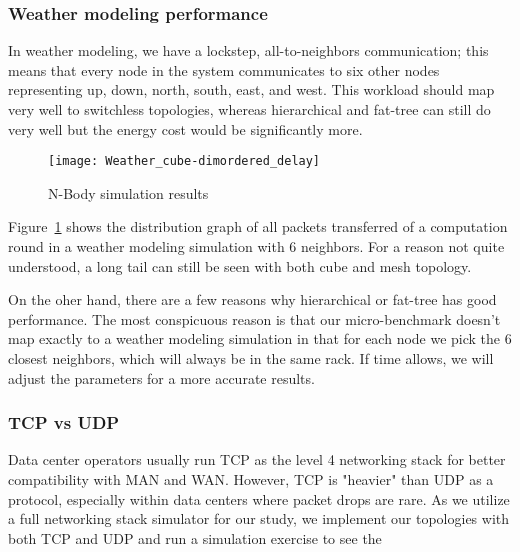 \subsubsection{Weather modeling performance}
In weather modeling, we have a lockstep, all-to-neighbors communication; this means that every node in the system communicates to six other nodes representing up, down, north, south, east, and west. This workload should map very well to switchless topologies, whereas hierarchical and fat-tree can still do very well but the energy cost would be significantly more.

\captionsetup[subfloat]{captionskip=-0.003in}
\begin{figure}
    \centering
        \texttt{[image: Weather\_cube-dimordered\_delay]}
        \label{fig:weather_packetdelay}
    \caption{N-Body simulation results}
\end{figure}

Figure~\ref{fig:weather_packetdelay} shows the distribution graph of all packets transferred of a computation round in a weather modeling simulation with 6 neighbors. For a reason not quite understood, a long tail can still be seen with both cube and mesh topology.

On the oher hand, there are a few reasons why hierarchical or fat-tree has good performance. The most conspicuous reason is that our micro-benchmark doesn't map exactly to a weather modeling simulation in that for each node we pick the 6 closest neighbors, which will always be in the same rack. If time allows, we will adjust the parameters for a more accurate results.

\subsubsection{TCP vs UDP}
Data center operators usually run TCP as the level 4 networking stack for better compatibility with MAN and WAN. However, TCP is "heavier" than UDP as a protocol, especially within data centers where packet drops are rare. As we utilize a full networking stack simulator for our study, we implement our topologies with both TCP and UDP and run a simulation exercise to see the 
